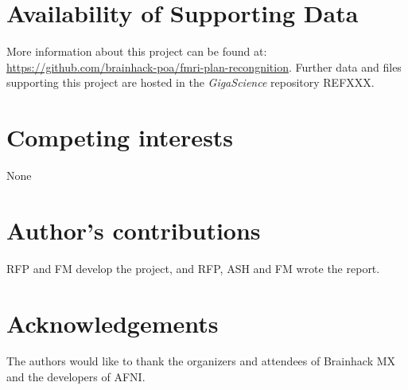 \documentclass[twocolumn]{bmcart}%
\begin{document}

\begin{backmatter}

\section*{Availability of Supporting Data}
More information about this project can be found at: \url{https://github.com/brainhack-poa/fmri-plan-recongnition}. Further data and files supporting this project are hosted in the \emph{GigaScience} repository REFXXX.

\section*{Competing interests}
None

\section*{Author's contributions}
RFP and FM develop the project, and RFP, ASH and FM wrote the report.

\section*{Acknowledgements}
The authors would like to thank the organizers and attendees of
Brainhack MX and the developers of AFNI.

  
  


\end{backmatter}
\end{document}
